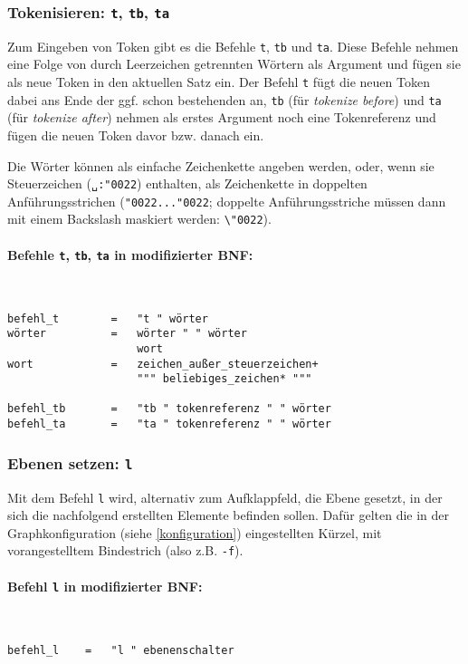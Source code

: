 \documentclass[12pt]{scrartcl}
\newcommand{\quo}{\char"0022}
\begin{document}
\subsubsection{Tokenisieren: \texttt{t}, \texttt{tb}, \texttt{ta}}

Zum Eingeben von Token gibt es die Befehle \texttt{t}, \texttt{tb} und \texttt{ta}. Diese Befehle nehmen eine Folge von durch Leerzeichen getrennten Wörtern als Argument und fügen sie als neue Token in den aktuellen Satz ein. Der Befehl \texttt{t} fügt die neuen Token dabei ans Ende der ggf. schon bestehenden an, \texttt{tb} (für \textit{tokenize before}) und \texttt{ta} (für \textit{tokenize after}) nehmen als erstes Argument noch eine Tokenreferenz und fügen die neuen Token davor bzw. danach ein.

Die Wörter können als einfache Zeichenkette angeben werden, oder, wenn sie Steuerzeichen (\texttt{␣:\quo}) enthalten, als Zeichenkette in doppelten Anführungsstrichen (\texttt{\quo...\quo}; doppelte Anführungsstriche müssen dann mit einem Backslash maskiert werden: \texttt{\textbackslash\quo}).

\paragraph*{Befehle \texttt{t}, \texttt{tb}, \texttt{ta} in modifizierter BNF:}
~
\begin{framed}
\begin{lstlisting}
befehl_t        =   "t " wörter
wörter          =   wörter " " wörter
                    wort
wort            =   zeichen_außer_steuerzeichen+
                    """ beliebiges_zeichen* """

befehl_tb       =   "tb " tokenreferenz " " wörter
befehl_ta       =   "ta " tokenreferenz " " wörter
\end{lstlisting}
\end{framed}


\subsubsection{Ebenen setzen: \texttt{l}}\label{l}

Mit dem Befehl \texttt{l} wird, alternativ zum Aufklappfeld, die Ebene gesetzt, in der sich die nachfolgend erstellten Elemente befinden sollen. Dafür gelten die in der Graphkonfiguration (siehe \ref{konfiguration}) eingestellten Kürzel, mit vorangestelltem Bindestrich (also z.B. \texttt{-f}).

\paragraph*{Befehl \texttt{l} in modifizierter BNF:}
~
\begin{framed}
\begin{lstlisting}
befehl_l    =   "l " ebenenschalter
\end{lstlisting}
\end{framed}
\end{document}
